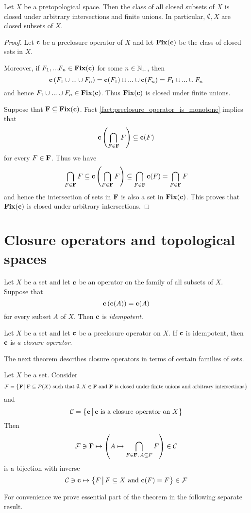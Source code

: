 \begin{proposition}\label{proposition:closed_subsets_of_pretopological_space}
	Let $X$ be a pretopological space. Then the class of all closed subsets of $X$ is closed under arbitrary intersections and finite unions. In particular, $\emptyset, X$ are closed subsets of $X$.
\end{proposition}
\begin{proof}
	Let $\mathbf{c}$ be a preclosure operator of $X$ and let $\mathbf{Fix}(\mathbf{c})$ be the class of closed sets in $X$.

	Moreover, if $F_1,...F_n \in \mathbf{Fix}(\mathbf{c})$ for some $n \in {\mathbb N}_+$, then
	$$\mathbf{c}\left(F_1 \cup ... \cup F_n\right) = \mathbf{c}(F_1) \cup ... \cup \mathbf{c}(F_n) = F_1 \cup ...\cup F_n$$
	and hence $F_1 \cup ... \cup F_n \in \mathbf{Fix}(\mathbf{c})$. Thus $\mathbf{Fix}(\mathbf{c})$ is closed under finite unions.

	Suppose that $\mathbf{F} \subseteq \mathbf{Fix}(\mathbf{c})$. Fact \ref{fact:preclosure_operator_is_monotone} implies that
	$$\mathbf{c}\left(\bigcap_{F\in \mathbf{F}}F\right) \subseteq \mathbf{c}(F)$$
	for every $F \in \mathbf{F}$. Thus we have
	$$\bigcap_{F \in \mathbf{F}}F \subseteq \mathbf{c}\left(\bigcap_{F\in \mathbf{F}}F\right) \subseteq \bigcap_{F\in \mathbf{F}}\mathbf{c}(F) = \bigcap_{F\in \mathbf{F}}F$$
	and hence the intersection of sets in $\mathbf{F}$ is also a set in $\mathbf{Fix}(\mathbf{c})$. This proves that $\mathbf{Fix}(\mathbf{c})$ is closed under arbitrary intersections.
\end{proof}

\section{Closure operators and topological spaces}

\begin{definition}
	Let $X$ be a set and let $\mathbf{c}$ be an operator on the family of all subsets of $X$. Suppose that
	$$\mathbf{c}\left(\mathbf{c}(A)\right) = \mathbf{c}(A)$$
	for every subset $A$ of $X$. Then $\mathbf{c}$ is \textit{idempotent}.
\end{definition}

\begin{definition}
	Let $X$ be a set and let $\mathbf{c}$ be a preclosure operator on $X$. If $\mathbf{c}$ is idempotent, then $\mathbf{c}$ is \textit{a closure operator}.
\end{definition}
\noindent
The next theorem describes closure operators in terms of certain families of sets.

\begin{theorem}\label{theorem:Kuratowski_closure_is_induced_by_a_closed_set_family}
	Let $X$ be a set. Consider
	$${\mathcal F} = \big\{\mathbf{F}\,\big|\,\mathbf{F}\subseteq {\mathcal P}(X)\mbox{ such that }\emptyset,X\in \mathbf{F}\mbox{ and }\mathbf{F}\mbox{ is closed under finite unions and arbitrary intersections}\big\}$$
	and
	$${\mathcal C} = \big\{\mathbf{c}\,\big|\,\mathbf{c}\mbox{ is a closure operator on }X\big\}$$
	Then
	$${\mathcal F} \ni \mathbf{F} \mapsto \left(A \mapsto \bigcap_{F\in \mathbf{F},\,A\subseteq F}F\right) \in {\mathcal C}$$
	is a bijection with inverse
	$${\mathcal C} \ni \mathbf{c} \mapsto \big\{F\,\big|\,F\subseteq X\mbox{ and }\mathbf{c}(F) = F\big\} \in {\mathcal F}$$
\end{theorem}
\noindent
For convenience we prove essential part of the theorem in the following separate result.

